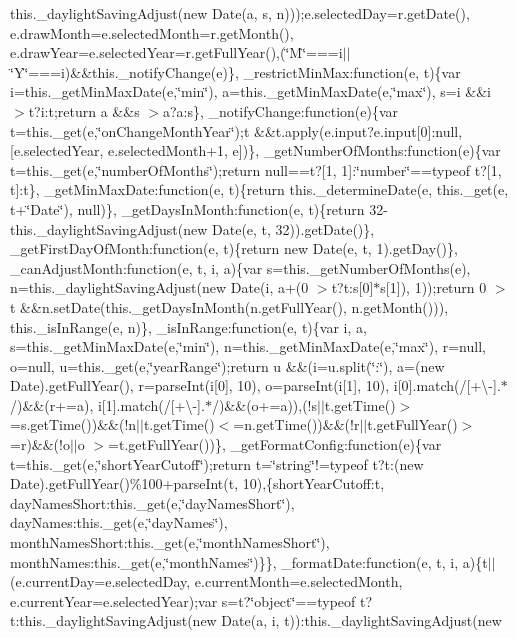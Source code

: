 \begin{DoxyCompactItemize}
this.\+\_\+daylight\+Saving\+Adjust(new Date(a, s, n)));e.\+selected\+Day=r.\+get\+Date(), e.\+draw\+Month=e.\+selected\+Month=r.\+get\+Month(), e.\+draw\+Year=e.\+selected\+Year=r.\+get\+Full\+Year(),(\char`\"{}\+M\char`\"{}===i$\vert$$\vert$\char`\"{}\+Y\char`\"{}===i)\&\&this.\+\_\+notify\+Change(e)\}, \+\_\+restrict\+Min\+Max\+:function(e, t)\{var i=this.\+\_\+get\+Min\+Max\+Date(e,\char`\"{}min\char`\"{}), a=this.\+\_\+get\+Min\+Max\+Date(e,\char`\"{}max\char`\"{}), s=i \&\&i $>$t?i\+:t;return a \&\&s $>$a?a\+:s\}, \+\_\+notify\+Change\+:function(e)\{var t=this.\+\_\+get(e,\char`\"{}on\+Change\+Month\+Year\char`\"{});t \&\&t.\+apply(e.\+input?e.\+input\mbox{[}0\mbox{]}\+:null,\mbox{[}e.\+selected\+Year, e.\+selected\+Month+1, e\mbox{]})\}, \+\_\+get\+Number\+Of\+Months\+:function(e)\{var t=this.\+\_\+get(e,\char`\"{}number\+Of\+Months\char`\"{});return null==t?\mbox{[}1, 1\mbox{]}\+:\char`\"{}number\char`\"{}==typeof t?\mbox{[}1, t\mbox{]}\+:t\}, \+\_\+get\+Min\+Max\+Date\+:function(e, t)\{return this.\+\_\+determine\+Date(e, this.\+\_\+get(e, t+\char`\"{}\+Date\char`\"{}), null)\}, \+\_\+get\+Days\+In\+Month\+:function(e, t)\{return 32-\/this.\+\_\+daylight\+Saving\+Adjust(new Date(e, t, 32)).\+get\+Date()\}, \+\_\+get\+First\+Day\+Of\+Month\+:function(e, t)\{return new Date(e, t, 1).\+get\+Day()\}, \+\_\+can\+Adjust\+Month\+:function(e, t, i, a)\{var s=this.\+\_\+get\+Number\+Of\+Months(e), n=this.\+\_\+daylight\+Saving\+Adjust(new Date(i, a+(0 $>$t?t\+:s\mbox{[}0\mbox{]}$\ast$s\mbox{[}1\mbox{]}), 1));return 0 $>$t \&\&n.\+set\+Date(this.\+\_\+get\+Days\+In\+Month(n.\+get\+Full\+Year(), n.\+get\+Month())), this.\+\_\+is\+In\+Range(e, n)\}, \+\_\+is\+In\+Range\+:function(e, t)\{var i, a, s=this.\+\_\+get\+Min\+Max\+Date(e,\char`\"{}min\char`\"{}), n=this.\+\_\+get\+Min\+Max\+Date(e,\char`\"{}max\char`\"{}), r=null, o=null, u=this.\+\_\+get(e,\char`\"{}year\+Range\char`\"{});return u \&\&(i=u.\+split(\char`\"{}\+:\char`\"{}), a=(new Date).\+get\+Full\+Year(), r=parse\+Int(i\mbox{[}0\mbox{]}, 10), o=parse\+Int(i\mbox{[}1\mbox{]}, 10), i\mbox{[}0\mbox{]}.\+match(/\mbox{[}+\textbackslash{}-\/\mbox{]}.$\ast$/)\&\&(r+=a), i\mbox{[}1\mbox{]}.\+match(/\mbox{[}+\textbackslash{}-\/\mbox{]}.$\ast$/)\&\&(o+=a)),(!s$\vert$$\vert$t.\+get\+Time()$>$=s.\+get\+Time())\&\&(!n$\vert$$\vert$t.\+get\+Time()$<$=n.\+get\+Time())\&\&(!r$\vert$$\vert$t.\+get\+Full\+Year()$>$=r)\&\&(!o$\vert$$\vert$o $>$=t.\+get\+Full\+Year())\}, \+\_\+get\+Format\+Config\+:function(e)\{var t=this.\+\_\+get(e,\char`\"{}short\+Year\+Cutoff\char`\"{});return t=\char`\"{}string\char`\"{}!=typeof t?t\+:(new Date).\+get\+Full\+Year()\%100+parse\+Int(t, 10),\{short\+Year\+Cutoff\+:t, day\+Names\+Short\+:this.\+\_\+get(e,\char`\"{}day\+Names\+Short\char`\"{}), day\+Names\+:this.\+\_\+get(e,\char`\"{}day\+Names\char`\"{}), month\+Names\+Short\+:this.\+\_\+get(e,\char`\"{}month\+Names\+Short\char`\"{}), month\+Names\+:this.\+\_\+get(e,\char`\"{}month\+Names\char`\"{})\}\}, \+\_\+format\+Date\+:function(e, t, i, a)\{t$\vert$$\vert$(e.\+current\+Day=e.\+selected\+Day, e.\+current\+Month=e.\+selected\+Month, e.\+current\+Year=e.\+selected\+Year);var s=t?\char`\"{}object\char`\"{}==typeof t?t\+:this.\+\_\+daylight\+Saving\+Adjust(new Date(a, i, t))\+:this.\+\_\+daylight\+Saving\+Adjust(new 
\end{DoxyCompactItemize}
